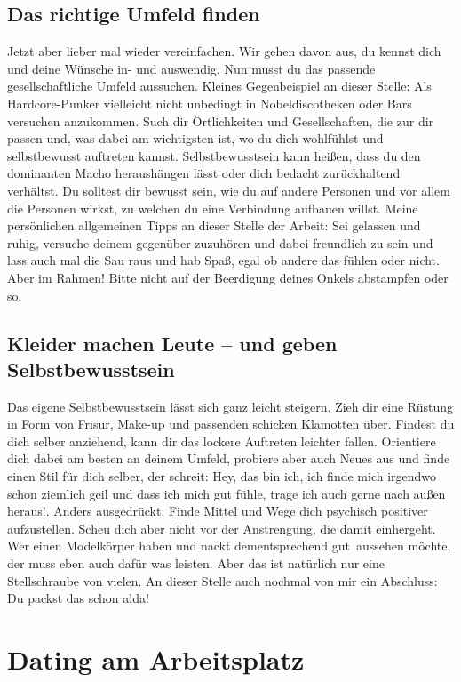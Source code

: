 \subsection{Das richtige Umfeld finden}
Jetzt aber lieber mal wieder vereinfachen. Wir gehen davon aus, du kennst dich und deine Wünsche in- und auswendig. Nun musst du das passende gesellschaftliche Umfeld aussuchen. Kleines Gegenbeispiel an dieser Stelle: Als Hardcore-Punker vielleicht nicht unbedingt in Nobeldiscotheken oder Bars versuchen anzukommen. Such dir Örtlichkeiten und Gesellschaften, die zur dir passen und, was dabei am wichtigsten ist, wo du dich wohlfühlst und selbstbewusst auftreten kannst. Selbstbewusstsein kann heißen, dass du den dominanten Macho heraushängen lässt oder dich bedacht zurückhaltend verhältst. Du solltest dir bewusst sein, wie du auf andere Personen und vor allem die Personen wirkst, zu welchen du eine Verbindung aufbauen willst. Meine persönlichen allgemeinen Tipps an dieser Stelle der Arbeit: Sei gelassen und ruhig, versuche deinem gegenüber zuzuhören und dabei freundlich zu sein und lass auch mal die Sau raus und hab Spaß, egal ob andere das fühlen oder nicht. Aber im Rahmen! Bitte nicht auf der Beerdigung deines Onkels abstampfen oder so.

\subsection{Kleider machen Leute – und geben Selbstbewusstsein}
Das eigene Selbstbewusstsein lässt sich ganz leicht steigern. Zieh dir eine Rüstung in Form von Frisur, Make-up und passenden schicken Klamotten über. Findest du dich selber anziehend, kann dir das lockere Auftreten leichter fallen. Orientiere dich dabei am besten an deinem Umfeld, probiere aber auch Neues aus und finde einen Stil für dich selber, der schreit: \glqq Hey, das bin ich, ich finde mich irgendwo schon ziemlich geil und dass ich mich gut fühle, trage ich auch gerne nach außen heraus!\grqq . Anders ausgedrückt: Finde Mittel und Wege dich psychisch positiver aufzustellen. Scheu dich aber nicht vor der Anstrengung, die damit einhergeht. Wer einen Modelkörper haben und nackt dementsprechend \glqq gut\grqq~aussehen möchte, der muss eben auch dafür was leisten. Aber das ist natürlich nur eine Stellschraube von vielen. An dieser Stelle auch nochmal von mir ein Abschluss: Du packst das schon alda!


\section{Dating am Arbeitsplatz}


